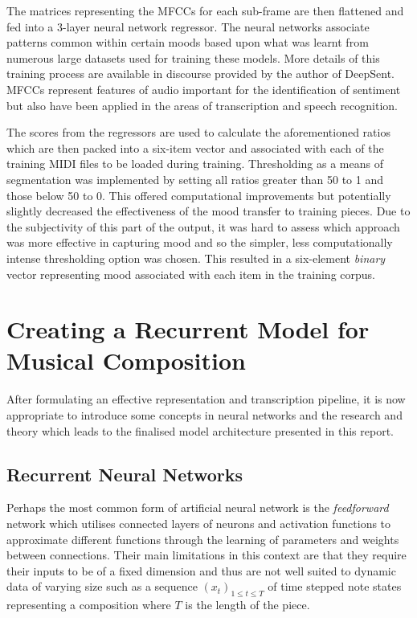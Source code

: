\documentclass[12pt,]{article}
\begin{document}
The matrices representing the MFCCs for each sub-frame are then
flattened and fed into a 3-layer neural network regressor. The neural
networks associate patterns common within certain moods based upon what
was learnt from numerous large datasets used for training these models.
More details of this training process are available in discourse
provided by the author of DeepSent. MFCCs represent features of audio
important for the identification of sentiment but also have been applied
in the areas of transcription and speech recognition.

The scores from the regressors are used to calculate the aforementioned
ratios which are then packed into a six-item vector and associated with
each of the training MIDI files to be loaded during training.
Thresholding as a means of segmentation was implemented by setting all
ratios greater than 50 to 1 and those below 50 to 0. This offered
computational improvements but potentially slightly decreased the
effectiveness of the mood transfer to training pieces. Due to the
subjectivity of this part of the output, it was hard to assess which
approach was more effective in capturing mood and so the simpler, less
computationally intense thresholding option was chosen. This resulted in
a six-element \emph{binary} vector representing mood associated with
each item in the training corpus.

\hypertarget{creating-a-recurrent-model-for-musical-composition}{%
\section{Creating a Recurrent Model for Musical
Composition}\label{creating-a-recurrent-model-for-musical-composition}}

After formulating an effective representation and transcription
pipeline, it is now appropriate to introduce some concepts in neural
networks and the research and theory which leads to the finalised model
architecture presented in this report.

\hypertarget{recurrent-neural-networks}{%
\subsection{Recurrent Neural Networks}\label{recurrent-neural-networks}}

Perhaps the most common form of artificial neural network is the
\emph{feedforward} network which utilises connected layers of neurons
and activation functions to approximate different functions through the
learning of parameters and weights between connections. Their main
limitations in this context are that they require their inputs to be of
a fixed dimension and thus are not well suited to dynamic data of
varying size such as a sequence \((x_t)_{1\le t\le T}\) of time stepped
note states representing a composition where \(T\) is the length of the
piece.
\end{document}
